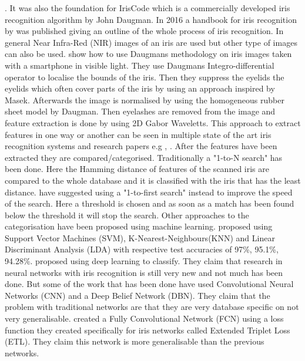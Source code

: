 . It was also the foundation for IrisCode which is a commercially developed iris recognition algorithm by John Daugman. In 2016 a handbook for iris recognition by \cite{Bowyer2016b} was published giving an outline of the whole process of iris recognition. In general Near Infra-Red (NIR) images of an iris are used but other type of images can also be used.  \cite{Khan2017a} show how to use Daugmans methodology on iris images taken with a smartphone in visible light. They use Daugmans Integro-differential operator to localise the bounds of the iris. Then they suppress the eyelids the eyelids which often cover parts of the iris by using an approach inspired by Masek. Afterwards the image is normalised by using the homogeneous rubber sheet model by Daugman. Then eyelashes are removed from the image and feature extraction is done by using 2D Gabor Waveletts. This approach to extract features in one way or another can be seen in multiple state of the art iris recognition systems and research papers e.g \citep{Luhadiya2017a,Uka2017a,Kuehlkamp2016a}, \cite{Kuehlkamp2016a}. After the features have been extracted they are compared/categorised. Traditionally a "1-to-N search" has been done. Here the Hamming distance of features of the scanned iris are compared to the whole database and it is classified with the iris that has the least distance. \cite{Kuehlkamp2016a} have suggested using a "1-to-first search" instead to improve the speed of the search. Here a threshold is chosen and as soon as a match has been found below the threshold it will stop the search. Other approaches to the categorisation have been proposed using machine learning. \cite{Khan2017a} proposed using Support Vector Machines (SVM), K-Nearest-Neighbours(KNN) and Linear Discriminant Analysis (LDA) with respective test accuracies of 97\%, 95.1\%, 94.28\%. \cite{Zhao2017b} proposed using deep learning to classify. They claim that research in neural networks with iris recognition is still very new and not much has been done. But some of the work that has been done have used Convolutional Neural Networks (CNN) and a Deep Belief Network (DBN). They claim that the problem with traditional networks are that they are very database specific on not very generalisable. \cite{Zhao2017b} created a Fully Convolutional Network (FCN) using a loss function they created specifically for iris networks called Extended Triplet Loss (ETL). They claim this network is more generalisable than the previous networks. 



